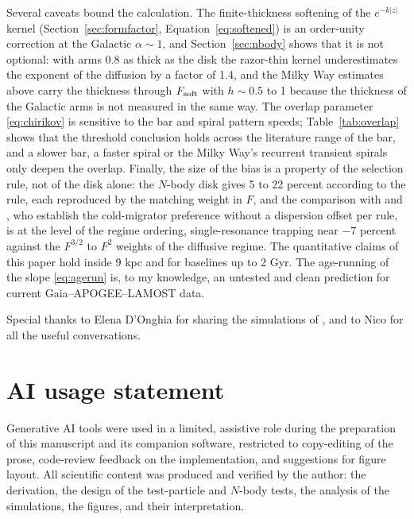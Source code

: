 \documentclass[twocolumn]{aastex701}
\begin{document}
Several caveats bound the calculation. The finite-thickness softening of the
$e^{-k|z|}$ kernel (Section~\ref{sec:formfactor}, Equation~\eqref{eq:softened}) is an
order-unity correction at the Galactic $\alpha\sim1$, and Section~\ref{sec:nbody}
shows that it is not optional: with arms 0.8 as thick as the disk the razor-thin
kernel underestimates the exponent of the diffusion by a factor of 1.4, and the Milky
Way estimates above carry the thickness through $F_{\rm soft}$ with $h\sim0.5$ to 1
because the thickness of the Galactic arms is not measured in the same way. The
overlap parameter \eqref{eq:chirikov} is sensitive to the bar and spiral pattern
speeds; Table~\ref{tab:overlap} shows that the threshold conclusion holds across the
literature range of the bar, and a slower bar, a faster spiral or the Milky Way's
recurrent transient spirals only deepen the overlap. Finally, the size of the bias is
a property of the selection rule, not of the disk alone: the $N$-body disk gives 5 to
22 percent according to the rule, each reproduced by the matching weight in $F$, and
the comparison with \citet{VeraCiro2016imprint} and \citet{Mikkola2020}, who establish
the cold-migrator preference without a dispersion offset per rule, is at the level of
the regime ordering, single-resonance trapping near $-7$ percent against the $F^{3/2}$
to $F^2$ weights of the diffusive regime. The quantitative claims of this paper hold
inside 9 kpc and for baselines up to 2 Gyr. The age-running of the slope
\eqref{eq:agerun} is, to my knowledge, an untested and clean prediction for current
Gaia--APOGEE--LAMOST data.

\begin{acknowledgments}
Special thanks to Elena D'Onghia for sharing the simulations of \citet{DOnghia2013},
and to Nico for all the useful conversations.
\end{acknowledgments}

\section*{AI usage statement}\label{sec:ai_usage}
Generative AI tools were used in a limited, assistive role during the preparation of
this manuscript and its companion software, restricted to copy-editing of the prose,
code-review feedback on the implementation, and suggestions for figure layout. All
scientific content was produced and verified by the author: the derivation, the design
of the test-particle and $N$-body tests, the analysis of the simulations, the figures,
and their interpretation.
\end{document}
